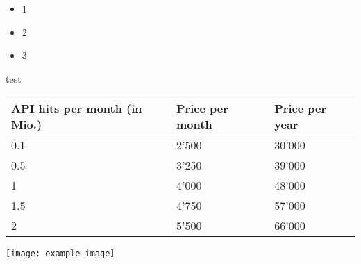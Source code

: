 \documentclass[xcolor={table}]{beamer}
\begin{document}
\begin{frame}
\begin{itemize}
\item 1
\item 2
\item 3
\end{itemize}
\begin{block}{test}
  \begin{minipage}{0.58\textwidth}
    \begin{tabularx}{\textwidth}{XXX}
        \footnotesize \textbf{API hits per month (in Mio.)} & 
        \footnotesize \textbf{Price per month} & 
        \footnotesize \textbf{Price per year} \\ \hline
      \rowcolor[HTML]{DDDDDD} 
      0.1                                   & 2'500                    & 30'000                  \\
      0.5                                   & 3'250                    & 39'000                  \\
      \rowcolor[HTML]{DDDDDD} 
      1                                     & 4'000                    & 48'000                  \\
      1.5                                   & 4'750                    & 57'000                  \\
      \rowcolor[HTML]{DDDDDD} 
      2                                     & 5'500                    & 66'000                 
    \end{tabularx}
  \end{minipage}%
  \hfill
\begin{minipage}{0.38\textwidth}
  \texttt{[image: example-image]}
\end{minipage}
\end{block}
\end{frame}
\end{document}
